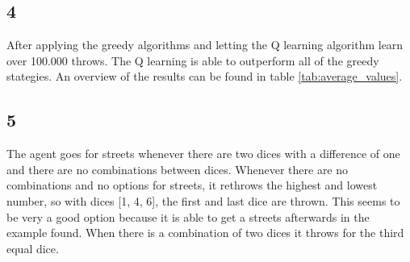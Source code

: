 \subsection*{4}
After applying the greedy algorithms and letting the Q learning algorithm learn over 100.000 throws. The Q learning is able to outperform all of the greedy stategies. An overview of the results can be found in table \ref{tab:average_values}.
\subsection*{5}
The agent goes for streets whenever there are two dices with a difference of one and there are no combinations between dices. Whenever there are no combinations and no options for streets, it rethrows the highest and lowest number, so with dices [1, 4, 6], the first and last dice are thrown. This seems to be very a good option because it is able to get a streets afterwards in the example found. When there is a combination of two dices it throws for the third equal dice.

